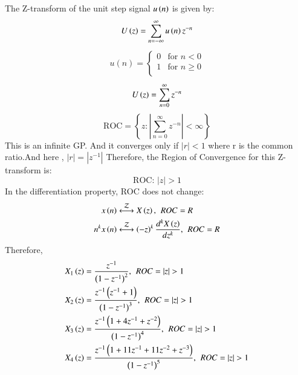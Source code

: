\documentclass[journal,12pt,twocolumn]{IEEEtran}
\theoremstyle{remark}
\begin{document}
\begin{enumerate}
The Z-transform of the unit step signal $u\left(n\right)$ is given by:
\begin{equation}\label{eq:z_transform}
    U\left(z\right) = \sum_{n=-\infty}^{\infty} u\left(n\right) z^{-n}
\end{equation}
\begin{align}
    u(n) = \begin{cases}
        0 & \text{for } n < 0 \\
        1 & \text{for } n \geq 0\\
    \end{cases}
\end{align}
\begin{align}
    U\left(z\right) = \sum_{n=0}^{\infty} z^{-n}\label{eq:z_transform_simplified}
\end{align}
\begin{equation}
    \text{ROC} = \left\{ z : \left| \sum_{n=0}^{\infty} z^{-n} \right| < \infty \right\}
\end{equation}
This is an infinite GP. And it converges only if $|r|<1$ where r is the common ratio.And here , $|r|=|z^{-1}|$ Therefore,
the Region of Convergence  for this Z-transform is:
\begin{equation}\label{eq:roc}
    \text{ROC: } |z| > 1
\end{equation}
In the differentiation property, ROC does not change:\\
\begin{align}
x\left(n\right) &\stackrel{\mathcal{Z}}{\longleftrightarrow} X\left(z\right),\hspace{4pt} ROC = R\\
n^k x\left(n\right) &\stackrel{\mathcal{Z}}{\longleftrightarrow} \left(-z\right)^k \frac{d^kX\left(z\right)}{dz^k},\hspace{4pt} ROC = R 
\end{align}
Therefore,
\begin{align}
    X_1\brak{z} &= \frac{z^{-1}}{\brak{1-z^{-1}}^2} , \hspace{4pt} ROC=|z|>1\\
    X_2\brak{z} &= \frac{z^{-1}\brak{z^{-1}+1}}{\brak{1-z^{-1}}^3} , \hspace{4pt} ROC=|z|>1\\
    X_3\brak{z} &= \frac{z^{-1}\brak{1+4z^{-1}+z^{-2}}}{\brak{1-z^{-1}}^4}, \hspace{4pt} ROC=|z|>1\\
    X_4\brak{z} &= \frac{z^{-1}\brak{1+11z^{-1}+11z^{-2}+z^{-3}}}{\brak{1-z^{-1}}^5}, \hspace{4pt} ROC=|z|>1

\end{align}
\end{enumerate}
\end{document}
